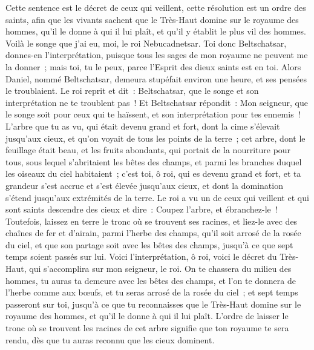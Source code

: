 \begin{multicols}{2}
Cette sentence est le décret de ceux qui veillent, cette résolution est un ordre des saints, afin que les vivants sachent que le Très-Haut domine sur le royaume des hommes, qu'il le donne à qui il lui plaît, et qu'il y établit le plus vil des hommes.
Voilà le songe que j'ai eu, moi, le roi Nebucadnetsar. Toi donc Beltschatsar, donnes-en l'interprétation, puisque tous les sages de mon royaume ne peuvent me la donner~; mais toi, tu le peux, parce l'Esprit des dieux saints est en toi.
Alors Daniel, nommé Beltschatsar, demeura stupéfait environ une heure, et ses pensées le troublaient. Le roi reprit et dit~: Beltschatsar, que le songe et son interprétation ne te troublent pas~! Et Beltschatsar répondit~: Mon seigneur, que le songe soit pour ceux qui te haïssent, et son interprétation pour tes ennemis~!
L'arbre que tu as vu, qui était devenu grand et fort, dont la cime s'élevait jusqu'aux cieux, et qu'on voyait de tous les points de la terre~;
cet arbre, dont le feuillage était beau, et les fruits abondants, qui portait de la nourriture pour tous, sous lequel s'abritaient les bêtes des champs, et parmi les branches duquel les oiseaux du ciel habitaient~;
c'est toi, ô roi, qui es devenu grand et fort, et ta grandeur s'est accrue et s'est élevée jusqu'aux cieux, et dont la domination s'étend jusqu'aux extrémités de la terre.
Le roi a vu un de ceux qui veillent et qui sont saints descendre des cieux et dire~: Coupez l'arbre, et ébranchez-le~! Toutefois, laissez en terre le tronc où se trouvent ses racines, et liez-le avec des chaînes de fer et d'airain, parmi l'herbe des champs, qu'il soit arrosé de la rosée du ciel, et que son partage soit avec les bêtes des champs, jusqu'à ce que sept temps soient passés sur lui.
Voici l'interprétation, ô roi, voici le décret du Très-Haut, qui s'accomplira sur mon seigneur, le roi.
On te chassera du milieu des hommes, tu auras ta demeure avec les bêtes des champs, et l'on te donnera de l'herbe comme aux bœufs, et tu seras arrosé de la rosée du ciel~; et sept temps passeront sur toi, jusqu'à ce que tu reconnaisses que le Très-Haut domine sur le royaume des hommes, et qu'il le donne à qui il lui plaît.
L'ordre de laisser le tronc où se trouvent les racines de cet arbre signifie que ton royaume te sera rendu, dès que tu auras reconnu que les cieux dominent.

\end{multicols}
